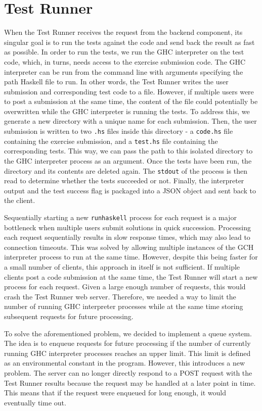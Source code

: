\chapter{Test Runner} \label{chap:TestRunner}
When the Test Runner receives the request from the backend component, its singular goal is to run the tests against the code and send back the result as fast as possible.
In order to run the tests, we run the GHC interpreter on the test code, which, in turns, needs access to the exercise submission code.
The GHC interpreter can be run from the command line with arguments specifying the path Haskell file to run.
In other words, the Test Runner writes the user submission and corresponding test code to a file.
However, if multiple users were to post a submission at the same time, the content of the file could potentially be overwritten while the GHC interpreter is running the tests.
To address this, we generate a new directory with a unique name for each submission.
Then, the user submission is written to two  \texttt{.hs} files inside this directory - a \texttt{code.hs} file containing the exercise submission, and a \texttt{test.hs} file containing the corresponding tests.
This way, we can pass the path to this isolated directory to the GHC interpreter process as an argument.
Once the tests have been run, the directory and its contents are deleted again.
The \texttt{stdout} of the process is then read to determine whether the tests succeeded or not.
Finally, the interpreter output and the test success flag is packaged into a JSON object and sent back to the client.

Sequentially starting a new \texttt{runhaskell} process for each request is a major bottleneck when multiple users submit solutions in quick succession.
Processing each request sequentially results in slow response times, which may also lead to connection timeouts.
This was solved by allowing multiple instances of the GCH interpreter process to run at the same time.
However, despite this being faster for a small number of clients, this approach in itself is not sufficient.
If multiple clients post a code submission at the same time, the Test Runner will start a new process for each request.
Given a large enough number of requests, this would crash the Test Runner web server.
Therefore, we needed a way to limit the number of running GHC interpreter processes while at the same time storing subsequent requests for future processing.

To solve the aforementioned problem, we decided to implement a queue system.
The idea is to enqueue requests for future processing if the number of currently running GHC interpreter processes reaches an upper limit.
This limit is defined as an environmental constant in the program.
However, this introduces a new problem.
The server can no longer directly respond to a POST request with the Test Runner results because the request may be handled at a later point in time.
This means that if the request were enqueued for long enough, it would eventually time out.




